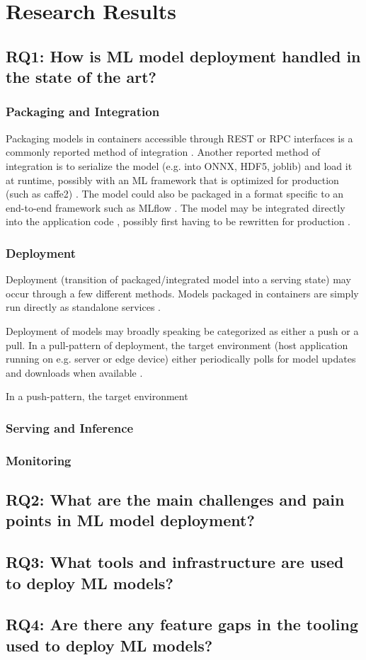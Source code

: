 \chapter{Research Results}
\section{RQ1: How is ML model deployment handled in the state of the art?}
\subsection{Packaging and Integration}
Packaging models in containers accessible through REST or RPC interfaces is a commonly reported method of integration \cite{Garcia2020, Li2017, Ruf2021, Crankshaw2017}.
Another reported method of integration is to serialize the model (e.g. into ONNX, HDF5, joblib) and load it at runtime, possibly with an ML framework that is optimized for production (such as caffe2) \cite{Hazelwood2018, Peticolas2019, Paeaekkoenen2020, Chahal2020}.
The model could also be packaged in a format specific to an end-to-end framework such as MLflow \cite{Chen2020}.
The model may be integrated directly into the application code \cite{Liu2020, Ruf2021, Granlund2021}, possibly first having to be rewritten for production \cite{Hazelwood2018}.

\subsection{Deployment}
Deployment (transition of packaged/integrated model into a serving state) may occur through a few different methods.
Models packaged in containers are simply run directly as standalone services \cite{Liu2020,Ruf2021, Granlund2021, Li2017, Garcia2020}.

Deployment of models may broadly speaking be categorized as either a push or a pull.
In a pull-pattern of deployment, the target environment (host application running on e.g. server or edge device) either periodically polls for model updates and downloads when available \cite{Paeaekkoenen2020, Li2017, Peticolas2019}.

In a push-pattern, the target environment



\subsection{Serving and Inference}
\subsection{Monitoring}
\section{RQ2: What are the main challenges and pain points in ML model deployment?}
\section{RQ3: What tools and infrastructure are used to deploy ML models?}
\section{RQ4: Are there any feature gaps in the tooling used to deploy ML models?}